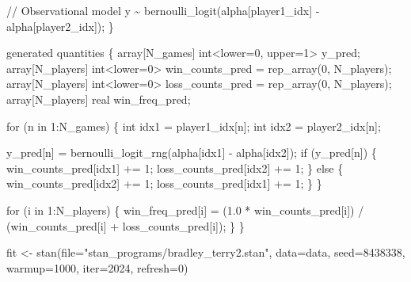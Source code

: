 \documentclass[
  letterpaper,
  DIV=11,
  numbers=noendperiod]{scrartcl}
\newenvironment{Shaded}{\begin{snugshade}}{\end{snugshade}}
\newcommand{\AttributeTok}[1]{\textcolor[rgb]{0.40,0.45,0.13}{#1}}
\newcommand{\CommentTok}[1]{\textcolor[rgb]{0.37,0.37,0.37}{#1}}
\newcommand{\ControlFlowTok}[1]{\textcolor[rgb]{0.00,0.23,0.31}{#1}}
\newcommand{\DataTypeTok}[1]{\textcolor[rgb]{0.68,0.00,0.00}{#1}}
\newcommand{\DecValTok}[1]{\textcolor[rgb]{0.68,0.00,0.00}{#1}}
\newcommand{\FloatTok}[1]{\textcolor[rgb]{0.68,0.00,0.00}{#1}}
\newcommand{\FunctionTok}[1]{\textcolor[rgb]{0.28,0.35,0.67}{#1}}
\newcommand{\KeywordTok}[1]{\textcolor[rgb]{0.00,0.23,0.31}{#1}}
\newcommand{\NormalTok}[1]{\textcolor[rgb]{0.00,0.23,0.31}{#1}}
\newcommand{\OtherTok}[1]{\textcolor[rgb]{0.00,0.23,0.31}{#1}}
\newcommand{\StringTok}[1]{\textcolor[rgb]{0.13,0.47,0.30}{#1}}
\begin{document}
\begin{codelisting}
\begin{Shaded}
\begin{Highlighting}[]
  \CommentTok{// Observational model}
\NormalTok{  y \textasciitilde{} bernoulli\_logit(alpha[player1\_idx] {-} alpha[player2\_idx]);}
\NormalTok{\}}

\KeywordTok{generated quantities}\NormalTok{ \{}
  \DataTypeTok{array}\NormalTok{[N\_games] }\DataTypeTok{int}\NormalTok{\textless{}}\KeywordTok{lower}\NormalTok{=}\DecValTok{0}\NormalTok{, }\KeywordTok{upper}\NormalTok{=}\DecValTok{1}\NormalTok{\textgreater{} y\_pred;}
  \DataTypeTok{array}\NormalTok{[N\_players] }\DataTypeTok{int}\NormalTok{\textless{}}\KeywordTok{lower}\NormalTok{=}\DecValTok{0}\NormalTok{\textgreater{} win\_counts\_pred}
\NormalTok{    = rep\_array(}\DecValTok{0}\NormalTok{, N\_players);}
  \DataTypeTok{array}\NormalTok{[N\_players] }\DataTypeTok{int}\NormalTok{\textless{}}\KeywordTok{lower}\NormalTok{=}\DecValTok{0}\NormalTok{\textgreater{} loss\_counts\_pred}
\NormalTok{    = rep\_array(}\DecValTok{0}\NormalTok{, N\_players);}
  \DataTypeTok{array}\NormalTok{[N\_players] }\DataTypeTok{real}\NormalTok{ win\_freq\_pred;}

  \ControlFlowTok{for}\NormalTok{ (n }\ControlFlowTok{in} \DecValTok{1}\NormalTok{:N\_games) \{}
    \DataTypeTok{int}\NormalTok{ idx1 = player1\_idx[n];}
    \DataTypeTok{int}\NormalTok{ idx2 = player2\_idx[n];}

\NormalTok{    y\_pred[n] = bernoulli\_logit\_rng(alpha[idx1] {-} alpha[idx2]);}
    \ControlFlowTok{if}\NormalTok{ (y\_pred[n]) \{}
\NormalTok{      win\_counts\_pred[idx1] += }\DecValTok{1}\NormalTok{;}
\NormalTok{      loss\_counts\_pred[idx2] += }\DecValTok{1}\NormalTok{;}
\NormalTok{    \} }\ControlFlowTok{else}\NormalTok{ \{}
\NormalTok{      win\_counts\_pred[idx2] += }\DecValTok{1}\NormalTok{;}
\NormalTok{      loss\_counts\_pred[idx1] += }\DecValTok{1}\NormalTok{;}
\NormalTok{    \}}
\NormalTok{  \}}

  \ControlFlowTok{for}\NormalTok{ (i }\ControlFlowTok{in} \DecValTok{1}\NormalTok{:N\_players) \{}
\NormalTok{    win\_freq\_pred[i] =   (}\FloatTok{1.0}\NormalTok{ * win\_counts\_pred[i])}
\NormalTok{                       / (win\_counts\_pred[i] + loss\_counts\_pred[i]);}
\NormalTok{  \}}
\NormalTok{\}}
\end{Highlighting}
\end{Shaded}

\end{codelisting}

\begin{Shaded}
\begin{Highlighting}[]
\NormalTok{fit }\OtherTok{\textless{}{-}} \FunctionTok{stan}\NormalTok{(}\AttributeTok{file=}\StringTok{"stan\_programs/bradley\_terry2.stan"}\NormalTok{,}
            \AttributeTok{data=}\NormalTok{data, }\AttributeTok{seed=}\DecValTok{8438338}\NormalTok{,}
            \AttributeTok{warmup=}\DecValTok{1000}\NormalTok{, }\AttributeTok{iter=}\DecValTok{2024}\NormalTok{, }\AttributeTok{refresh=}\DecValTok{0}\NormalTok{)}
\end{Highlighting}
\end{Shaded}
\end{document}
